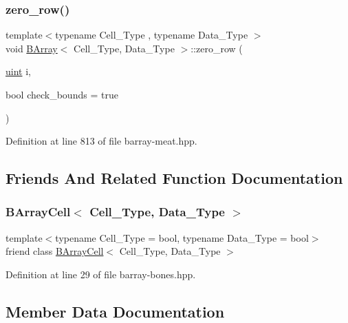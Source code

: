\subsubsection{\texorpdfstring{zero\+\_\+row()}{zero\_row()}}
{\footnotesize\ttfamily template$<$typename Cell\+\_\+\+Type , typename Data\+\_\+\+Type $>$ \\
void \hyperlink{class_b_array}{B\+Array}$<$ Cell\+\_\+\+Type, Data\+\_\+\+Type $>$\+::zero\+\_\+row (\begin{DoxyParamCaption}\item[{\hyperlink{typedefs_8hpp_a91ad9478d81a7aaf2593e8d9c3d06a14}{uint}}]{i,  }\item[{bool}]{check\+\_\+bounds = {\ttfamily true} }\end{DoxyParamCaption})\hspace{0.3cm}{\ttfamily [inline]}}



Definition at line 813 of file barray-\/meat.\+hpp.



\subsection{Friends And Related Function Documentation}
\mbox{\label{class_b_array_a2cd2ece8a4fc1027d3151b1ec33151cb}} 
\subsubsection{\texorpdfstring{B\+Array\+Cell$<$ Cell\+\_\+\+Type, Data\+\_\+\+Type $>$}{BArrayCell< Cell\_Type, Data\_Type >}}
{\footnotesize\ttfamily template$<$typename Cell\+\_\+\+Type = bool, typename Data\+\_\+\+Type = bool$>$ \\
friend class \hyperlink{class_b_array_cell}{B\+Array\+Cell}$<$ Cell\+\_\+\+Type, Data\+\_\+\+Type $>$\hspace{0.3cm}{\ttfamily [friend]}}



Definition at line 29 of file barray-\/bones.\+hpp.



\subsection{Member Data Documentation}
\mbox{\label{class_b_array_a5700cd9bb3814f84c62dda0ea47931bc}} 
